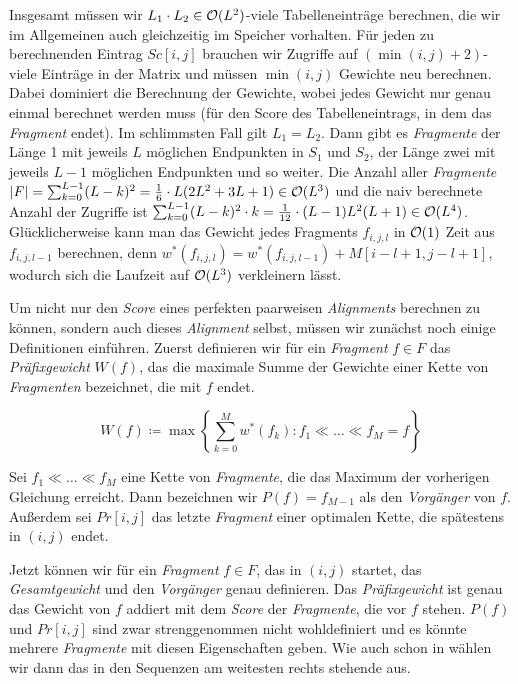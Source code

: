\begin{beweis}
	Insgesamt müssen wir $L_1 \cdot L_2 \in \mathcal{O}(L^2)$-viele Tabelleneinträge berechnen, die wir im Allgemeinen auch gleichzeitig im Speicher vorhalten. Für jeden zu berechnenden Eintrag $Sc[i,j]$ brauchen wir Zugriffe auf $(\min(i,j) + 2)$-viele Einträge in der Matrix und müssen $\min(i,j)$ Gewichte neu berechnen. Dabei dominiert die Berechnung der Gewichte, wobei jedes Gewicht nur genau einmal berechnet werden muss (für den Score des Tabelleneintrags, in dem das \emph{Fragment} endet). Im schlimmsten Fall gilt $L_1 = L_2$. Dann gibt es \emph{Fragmente} der Länge 1 mit jeweils $L$ möglichen Endpunkten in $S_1$ und $S_2$, der Länge zwei mit jeweils $L-1$ möglichen Endpunkten und so weiter. Die Anzahl aller \emph{Fragmente} $|F| = \sum_{k=0}^{L-1}(L-k)^2 = \frac{1}{6} \cdot L(2L^2+3L+1) \in \mathcal{O}(L^3)$ und die naiv berechnete Anzahl der Zugriffe ist $\sum_{k=0}^{L-1}(L-k)^2\cdot k = \frac{1}{12} \cdot (L-1)L^2(L+1) \in \mathcal{O}(L^4)$. Glücklicherweise kann man das Gewicht jedes Fragments $f_{i,j,l}$ in $\mathcal{O}(1)$ Zeit aus $f_{i,j,l-1}$ berechnen, denn $w^*(f_{i,j,l}) = w^*(f_{i,j,l-1}) + M[i\!-\!l\!+\!1, j\!-\!l\!+\!1]$, wodurch sich die Laufzeit auf $\mathcal{O}(L^3)$ verkleinern lässt.
\end{beweis}

Um nicht nur den \emph{Score} eines perfekten paarweisen \emph{Alignments} berechnen zu können, sondern auch dieses \emph{Alignment} selbst, müssen wir zunächst noch einige Definitionen einführen. Zuerst definieren wir für ein \emph{Fragment} $f \in F$ das \emph{Präfixgewicht} $W(f)$, das die maximale Summe der Gewichte einer Kette von \emph{Fragmenten} bezeichnet, die mit $f$ endet.

\begin{equation}
	W(f) \coloneqq \max \left\{ \sum_{k=0}^{M} w^*(f_k) : f_1 \ll \dots \ll f_M=f \right\}
\end{equation}

\begin{definition}[Vorgänger]
	Sei $f_1 \ll \dots \ll f_M$ eine Kette von \emph{Fragmente}, die das Maximum der vorherigen Gleichung erreicht. Dann bezeichnen wir $P(f) = f_{M-1}$ als den \emph{Vorgänger} von $f$. Außerdem sei $Pr[i,j]$ das letzte \emph{Fragment} einer optimalen Kette, die spätestens in $(i,j)$ endet. 
\end{definition}

Jetzt können wir für ein \emph{Fragment} $f \in F$, das in $(i,j)$ startet, das \emph{Gesamtgewicht} und den \emph{Vorgänger} genau definieren. Das \emph{Präfixgewicht} ist genau das Gewicht von $f$ addiert mit dem \emph{Score} der \emph{Fragmente}, die vor $f$ stehen. $P(f)$ und $Pr[i,j]$ sind zwar strenggenommen nicht wohldefiniert und es könnte mehrere \emph{Fragmente} mit diesen Eigenschaften geben. Wie auch schon in \cite{mdw96} wählen wir dann das in den Sequenzen am weitesten rechts stehende aus.

